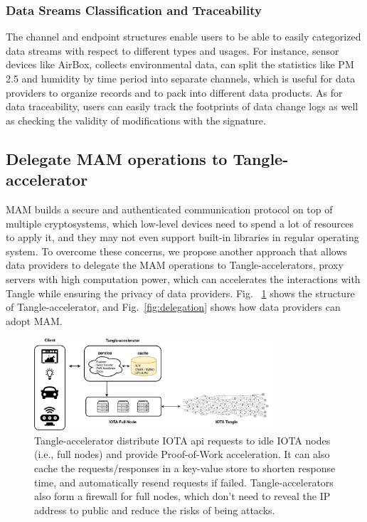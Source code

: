 \documentclass[conference]{IEEEtran}
\begin{document}
\subsubsection{Data Sreams Classification and Traceability}
The channel and endpoint structures enable users to be able to easily categorized data streams with respect to different types and usages. For instance, sensor devices like AirBox\cite{LASS}, collects environmental data, can split the statistics like PM 2.5 and humidity by time period into separate channels, which is useful for data providers to organize records and to pack into different data products. As for data traceability, users can easily track the footprints of data change logs as well as checking the validity of modifications with the signature.

\subsection{Delegate MAM operations to Tangle-accelerator}
\label{section:ta_endpoint}
MAM builds a secure and authenticated communication protocol on top of multiple cryptosystems, which low-level devices need to spend a lot of resources to apply it, and they may not even support built-in libraries in regular operating system. To overcome these concerns, we propose another approach that allows data providers to delegate the MAM operations to Tangle-accelerators, proxy servers with high computation power, which can accelerates the interactions with Tangle while ensuring the privacy of data providers. Fig.~ \ref{fig:ta_struct} shows the structure of Tangle-accelerator, and Fig.~\ref{fig:delegation} shows how data providers can adopt MAM.

\begin{figure}[!t]
    \centering
    \includegraphics[width=3.5in]{ta_structure}
    \caption{Tangle-accelerator distribute IOTA api requests to idle IOTA nodes (i.e., full nodes) and provide Proof-of-Work acceleration. It can also cache the requests/responses in a key-value store to shorten response time, and automatically resend requests if failed. Tangle-accelerators also form a firewall for full nodes, which don't need to reveal the IP address to public and reduce the risks of being attacks.}
    \label{fig:ta_struct}
\end{figure}
\end{document}
